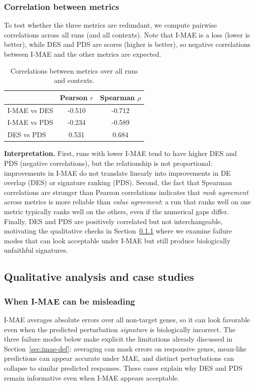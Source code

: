 \documentclass[12pt]{article}
\begin{document}
\subsubsection{Correlation between metrics}
To test whether the three metrics are redundant, we compute pairwise correlations across all runs
(and all contexts). Note that I-MAE is a loss (lower is better), while DES and PDS are scores (higher
is better), so negative correlations between I-MAE and the other metrics are expected.

\begin{table}[H]
\centering
\caption{Correlations between metrics over all runs and contexts.}
\label{tab:metric-corr}
\begin{tabular}{lcc}
\toprule
 & Pearson $r$ & Spearman $\rho$ \\
\midrule
I-MAE vs DES & -0.510 & -0.712 \\
I-MAE vs PDS & -0.234 & -0.589 \\
DES vs PDS   &  0.531 &  0.684 \\
\bottomrule
\end{tabular}
\end{table}

\textbf{Interpretation.}
First, runs with lower I-MAE tend to have higher DES and PDS (negative correlations), but the
relationship is not proportional: improvements in I-MAE do not translate linearly into improvements
in DE overlap (DES) or signature ranking (PDS).
Second, the fact that Spearman correlations are stronger than Pearson correlations indicates that
\emph{rank agreement} across metrics is more reliable than \emph{value agreement}: a run that ranks
well on one metric typically ranks well on the others, even if the numerical gaps differ.
Finally, DES and PDS are positively correlated but not interchangeable, motivating the qualitative
checks in Section~\ref{sec:qualitative} where we examine failure modes that can look acceptable under
I-MAE but still produce biologically unfaithful signatures.

\subsection{Qualitative analysis and case studies}
\subsubsection{When I-MAE can be misleading}
\label{sec:qualitative}
I-MAE averages absolute errors over all non-target genes, so it can look favorable even when the
predicted perturbation \emph{signature} is biologically incorrect. The three failure modes below make
explicit the limitations already discussed in Section~\ref{sec:imae-def}: averaging can mask errors on
responsive genes, mean-like predictions can appear accurate under MAE, and distinct perturbations can
collapse to similar predicted responses. These cases explain why DES and PDS remain informative even
when I-MAE appears acceptable.
\end{document}
